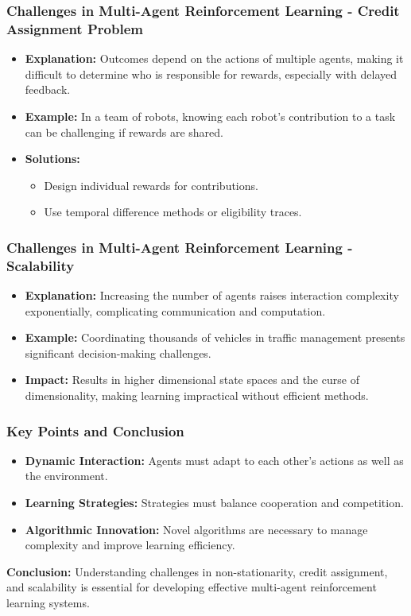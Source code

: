 \documentclass[aspectratio=169]{beamer}
\begin{document}
\begin{frame}[fragile]
    \frametitle{Challenges in Multi-Agent Reinforcement Learning - Credit Assignment Problem}
    \begin{itemize}
        \item \textbf{Explanation:} Outcomes depend on the actions of multiple agents, making it difficult to determine who is responsible for rewards, especially with delayed feedback.
        \item \textbf{Example:} In a team of robots, knowing each robot’s contribution to a task can be challenging if rewards are shared.
        \item \textbf{Solutions:}
        \begin{itemize}
            \item Design individual rewards for contributions.
            \item Use temporal difference methods or eligibility traces.
        \end{itemize}
    \end{itemize}
\end{frame}

\begin{frame}[fragile]
    \frametitle{Challenges in Multi-Agent Reinforcement Learning - Scalability}
    \begin{itemize}
        \item \textbf{Explanation:} Increasing the number of agents raises interaction complexity exponentially, complicating communication and computation.
        \item \textbf{Example:} Coordinating thousands of vehicles in traffic management presents significant decision-making challenges.
        \item \textbf{Impact:} Results in higher dimensional state spaces and the curse of dimensionality, making learning impractical without efficient methods.
    \end{itemize}
\end{frame}

\begin{frame}[fragile]
    \frametitle{Key Points and Conclusion}
    \begin{itemize}
        \item \textbf{Dynamic Interaction:} Agents must adapt to each other's actions as well as the environment.
        \item \textbf{Learning Strategies:} Strategies must balance cooperation and competition.
        \item \textbf{Algorithmic Innovation:} Novel algorithms are necessary to manage complexity and improve learning efficiency.
    \end{itemize}

    \textbf{Conclusion:} Understanding challenges in non-stationarity, credit assignment, and scalability is essential for developing effective multi-agent reinforcement learning systems.
\end{frame}
\end{document}
